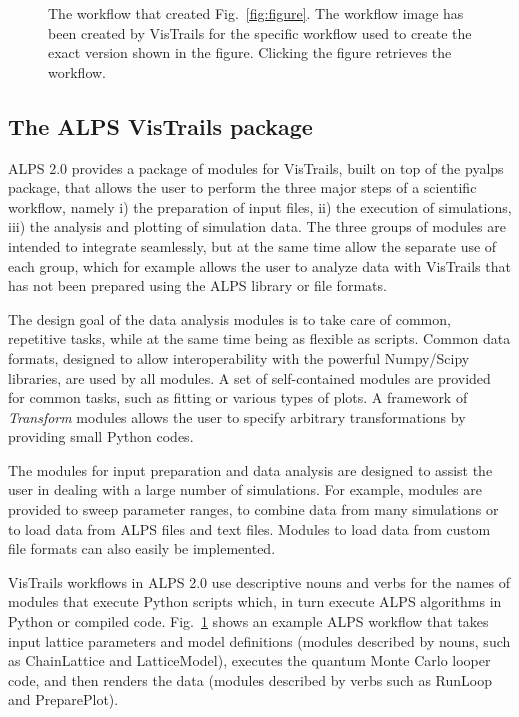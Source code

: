\documentclass[12pt]{iopart}
\begin{document}
\begin{figure}
\begin{center}
\caption{The workflow that created Fig.~\ref{fig:figure}. The workflow image has been created by VisTrails for the specific workflow used to create the exact version shown in the figure. Clicking the figure retrieves the workflow.}
\label{fig:workflow}
\end{center}
\end{figure}



\subsection{The ALPS VisTrails package}

ALPS 2.0 provides a package of modules for VisTrails, built on top of the pyalps package, that allows the user to perform the three major steps of a scientific workflow, namely i) the preparation of input files, ii) the execution of simulations, iii) the analysis and plotting of simulation data. The three groups of modules are intended to integrate seamlessly, but at the same time allow the separate use of each group, which for example allows the user to analyze data with VisTrails that has not been prepared using the ALPS library or file formats.

The design goal of the data analysis modules is to take care of common, repetitive tasks, while at the same time being as flexible as scripts. Common data formats, designed to allow interoperability with the powerful Numpy/Scipy libraries, are used by all modules. A set of self-contained modules are provided for common tasks, such as fitting or various types of plots. A framework of {\it Transform} modules allows the user to specify arbitrary transformations by providing small Python codes.

The modules for input preparation and data analysis are designed to assist the user in dealing with a large number of simulations. For example, modules are provided to sweep parameter ranges, to combine data from many simulations or to load data from ALPS files and text files. Modules to load data from custom file formats can also easily be implemented.

VisTrails workflows in ALPS 2.0 use descriptive nouns and verbs for the names of modules that execute
 Python scripts which, in turn execute ALPS
algorithms in Python or compiled code. Fig.~\ref{fig:workflow} shows an example ALPS workflow
that takes input lattice parameters and model definitions (modules described by nouns, such as 
 ChainLattice and LatticeModel), executes the quantum
Monte Carlo looper code, and then renders the data (modules described by verbs such as RunLoop and PreparePlot).
\end{document}
